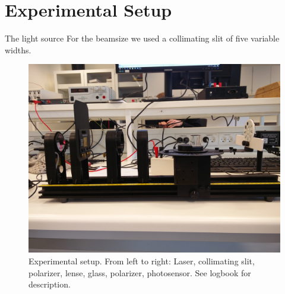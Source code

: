 \section{Experimental Setup}
The light source For the beamsize we used a collimating slit of five variable widths.

\begin{figure}[h]
    \centering
    \includegraphics[trim={0 25cm 0 20cm}, clip, width=\columnwidth]{setup}
    \caption{Experimental setup. From left to right: Laser, collimating slit, polarizer, lense, glass, polarizer, photosensor. See logbook for description.}
    \label{fig:setup}
\end{figure}

